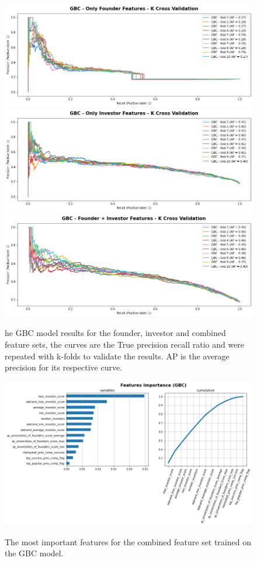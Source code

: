 \documentclass{article}
\begin{document}
\begin{figure}[h]
	\centering
	\includegraphics[width=\textwidth]{figures/gbc_founder_kcross}
	\includegraphics[width=\textwidth]{figures/gbc_investor_kcross}
	\includegraphics[width=\textwidth]{figures/gbc_combined_kcross}
	\caption{he GBC model results for the founder, investor and combined feature sets, the curves are the True precision recall ratio and were repeated with k-folds to validate the results. AP is the average precision for its respective curve.}
	\label{fig:gbc_model}
\end{figure}

\begin{figure}[h]
	\centering
	\caption{The most important features for the combined feature set trained on the GBC model.}
	\includegraphics[width=\textwidth]{figures/gbc_feature_analysis}
	\label{fig:gbc_features}
\end{figure}
\end{document}
